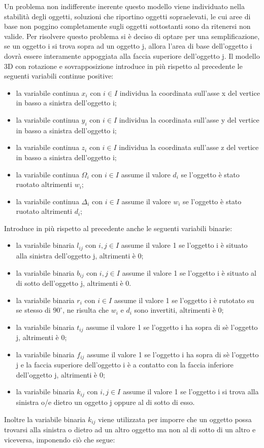 Un problema non indifferente inerente questo modello viene individuato nella stabilità degli oggetti, soluzioni che riportino oggetti sopraelevati, le cui aree di base non poggino completamente sugli oggetti sottostanti sono da ritenersi non valide. Per risolvere questo problema si è deciso di optare per una semplificazione, se un oggetto i si trova sopra ad un oggetto j, allora l'area di base dell'oggetto i dovrà essere interamente appoggiata alla faccia superiore dell'oggetto j.
\newpage
Il modello 3D con rotazione e sovrapposizione introduce in più rispetto al precedente le seguenti variabili continue positive:
\begin{itemize}
	\item la variabile continua $x_{i}$ con $i \in I$ individua la coordinata sull'asse x del vertice in basso a sinistra dell'oggetto i;
	\item la variabile continua $y_{i}$ con $i \in I$ individua la coordinata sull'asse y del vertice in basso a sinistra dell'oggetto i;
	\item la variabile continua $z_{i}$ con $i \in I$ individua la coordinata sull'asse z del vertice in basso a sinistra dell'oggetto i;
	\item la variabile continua $\Omega_{i}$ con $i \in I$ assume il valore $d_i$ se l'oggetto è stato ruotato altrimenti $w_i$;
	\item la variabile continua $\Delta_{i}$ con $i \in I$ assume il valore $w_i$ se l'oggetto è stato ruotato altrimenti $d_i$;
\end{itemize}
Introduce in più rispetto al precedente anche le seguenti variabili binarie:
\begin{itemize}
	\item la variabile binaria $l_{ij}$ con $i,j \in I$ assume il valore 1 se l'oggetto i è situato alla sinistra dell'oggetto j, altrimenti è 0;
	\item la variabile binaria $b_{ij}$ con $i,j \in I$ assume il valore 1 se l'oggetto i è situato al di sotto dell'oggetto j, altrimenti è 0.
	\item la variabile binaria $r_{i}$ con $i \in I$ assume il valore 1 se l'oggetto i è rutotato su se stesso di $90^{\circ}$, ne risulta che $w_{i}$ e $d_{i}$ sono invertiti, altrimenti è 0;
	\item la variabile binaria $t_{ij}$ assume il valore 1 se l'oggetto i ha sopra di sè l'oggetto j, altrimenti è 0;
	\item la variabile binaria $f_{ij}$ assume il valore 1 se l'oggetto i ha sopra di sè l'oggetto j e la faccia superiore dell'oggetto i è a contatto con la faccia inferiore dell'oggetto j, altrimenti è 0;
	\item la variabile binaria $k_{ij}$ con $i,j \in I$ assume il valore 1 se l'oggetto i si trova alla sinistra o/e dietro un oggetto j oppure al di sotto di esso. 
\end{itemize}
\newpage
Inoltre la variabile binaria $k_{ij}$ viene utilizzata per imporre che un oggetto possa trovarsi alla sinistra o dietro ad un altro oggetto ma non al di sotto di un altro e viceversa, imponendo ciò che segue:

